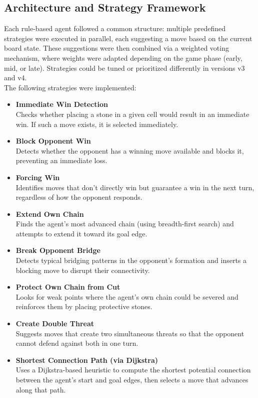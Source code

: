 \documentclass[conference]{IEEEtran}
\begin{document}
\subsection{Architecture and Strategy Framework} \label{ASF}
Each rule-based agent followed a common structure: multiple predefined strategies were executed in parallel, each suggesting a move based on the current board state. These suggestions were then combined via a weighted voting mechanism, where weights were adapted depending on the game phase (early, mid, or late). Strategies could be tuned or prioritized differently in versions v3 and v4.\\
The following strategies were implemented:
\begin{itemize}[]
\item \textbf{Immediate Win Detection} \\
Checks whether placing a stone in a given cell would result in an immediate win. If such a move exists, it is selected immediately.
\item \textbf{Block Opponent Win} \\
Detects whether the opponent has a winning move available and blocks it, preventing an immediate loss.
\item \textbf{Forcing Win} \\
Identifies moves that don’t directly win but guarantee a win in the next turn, regardless of how the opponent responds.
\item \textbf{Extend Own Chain} \\
Finds the agent’s most advanced chain (using breadth-first search) and attempts to extend it toward its goal edge.
\item \textbf{Break Opponent Bridge} \\
Detects typical bridging patterns in the opponent’s formation and inserts a blocking move to disrupt their connectivity.
\item \textbf{Protect Own Chain from Cut} \\
Looks for weak points where the agent’s own chain could be severed and reinforces them by placing protective stones.
\item \textbf{Create Double Threat} \\
Suggests moves that create two simultaneous threats so that the opponent cannot defend against both in one turn.
\item \textbf{Shortest Connection Path (via Dijkstra)} \\
Uses a Dijkstra-based heuristic to compute the shortest potential connection between the agent’s start and goal edges, then selects a move that advances along that path.

\end{itemize}
\end{document}
